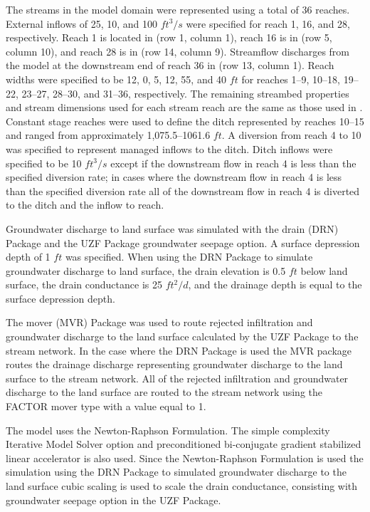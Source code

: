 The streams in the model domain were represented using a total of 36 reaches. External inflows of 25, 10, and 100 $ft^{3}/s$ were specified for reach 1, 16, and 28, respectively. Reach 1 is located in (row 1, column 1), reach 16 is in (row 5, column 10), and reach 28 is in (row 14, column 9). Streamflow discharges from the model at the downstream end of reach 36 in (row 13, column 1). Reach widths were specified to be 12, 0, 5, 12, 55, and 40 $ft$ for reaches 1--9, 10--18, 19--22, 23--27, 28--30, and 31--36, respectively. The remaining streambed properties and stream dimensions used for each stream reach are the same as those used in 
 \cite{modflowsfr1pack} \cite[see][Table~1]{modflowsfr1pack}. Constant stage reaches were used to define the ditch represented by reaches 10--15 and ranged from approximately 1,075.5--1061.6 $ft$. A diversion from reach 4 to 10 was specified to represent managed inflows to the ditch. Ditch inflows were specified to be 10 $ft^{3}/s$ except if the downstream flow in reach 4 is less than the specified diversion rate; in cases where the downstream flow in reach 4 is less than the specified diversion rate all of the downstream flow in reach 4 is diverted to the ditch and the inflow to reach.
 
Groundwater discharge to land surface was simulated with the drain (DRN) Package and the UZF Package groundwater seepage option.  A surface depression depth of 1 $ft$ was specified. When using the DRN Package to simulate groundwater discharge to land surface, the drain elevation is 0.5 $ft$ below land surface, the drain conductance is 25 $ft^{2}/d$, and the drainage depth is equal to the surface depression depth.

The mover (MVR) Package was used to route rejected infiltration and groundwater discharge to the land surface calculated by the UZF Package to the stream network. In the case where the DRN Package is used the MVR package routes the drainage discharge representing groundwater discharge to the land surface to the stream network. All of the rejected infiltration and groundwater discharge to the land surface are routed to the stream network using the FACTOR mover type with a value equal to 1.

The model uses the Newton-Raphson Formulation. The simple complexity Iterative Model Solver option and preconditioned bi-conjugate gradient stabilized linear accelerator is also used. Since the Newton-Raphson Formulation is used the simulation using the DRN Package to simulated groundwater discharge to the land surface cubic scaling is used to scale the drain conductance, consisting with groundwater seepage option in the UZF Package.

